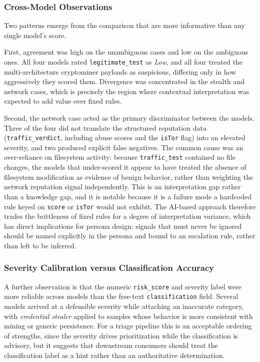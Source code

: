 \subsubsection{Cross-Model Observations}
\noindent
Two patterns emerge from the comparison that are more informative than any single
model's score. 

First, agreement was high on the unambiguous cases and low on the ambiguous ones.
All four models rated \texttt{legitimate\_test} as \textit{Low}, and all four
treated the multi-architecture cryptominer payloads as suspicious, differing only
in how aggressively they scored them. Divergence was concentrated in the stealth
and network cases, which is precisely the region where contextual interpretation
was expected to add value over fixed rules.

\vspace{1em}

Second, the network case acted as the primary discriminator between the models.
Three of the four did not translate the structured reputation data
(\texttt{traffic\_verdict}, including abuse scores and the \texttt{isTor} flag)
into an elevated severity, and two produced explicit false negatives. The common
cause was an over-reliance on filesystem activity: because
\texttt{traffic\_test} contained no file changes, the models that under-scored it
appear to have treated the absence of filesystem modification as evidence of
benign behavior, rather than weighting the network reputation signal
independently. This is an interpretation gap rather than a knowledge gap, and it
is notable because it is a failure mode a hardcoded rule keyed on
\texttt{score} or \texttt{isTor} would not exhibit. The AI-based approach
therefore trades the brittleness of fixed rules for a degree of interpretation
variance, which has direct implications for persona design: signals that must
never be ignored should be named explicitly in the persona and bound to an
escalation rule, rather than left to be inferred.

\subsubsection{Severity Calibration versus Classification Accuracy}
\noindent
A further observation is that the numeric \texttt{risk\_score} and severity label
were more reliable across models than the free-text \texttt{classification}
field. Several models arrived at a defensible severity while attaching an
inaccurate category, with \textit{credential stealer} applied to samples whose
behavior is more consistent with mining or generic persistence. For a triage
pipeline this is an acceptable ordering of strengths, since the severity drives
prioritization while the classification is advisory, but it suggests that
downstream consumers should treat the classification label as a hint rather than
an authoritative determination.

